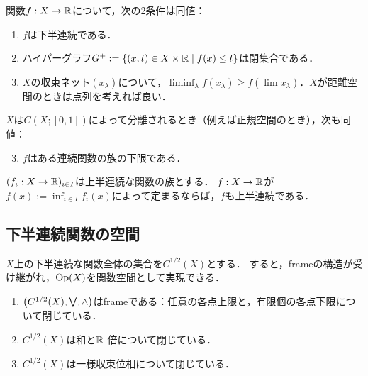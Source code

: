 \documentclass[uplatex,dvipdfmx]{jsreport}
\begin{document}
\begin{theorem}[下半連続性の特徴付け]
    関数$f:X\to\mathbb{R}$について，次の2条件は同値：
    \begin{enumerate}
        \item $f$は下半連続である．
        \item ハイパーグラフ$G^+:=\left\{(x,t)\in X\times\mathbb{R}\mid f(x)\le t\right\}$は閉集合である．
        \item $X$の収束ネット$(x_\lambda)$について，$\liminf_\lambda f(x_\lambda)\ge f(\lim x_\lambda)$．$X$が距離空間のときは点列を考えれば良い．
    \end{enumerate}
    $X$は$C(X;[0,1])$によって分離されるとき（例えば正規空間のとき），次も同値：
    \begin{enumerate}\setcounter{enumi}{2}
        \item $f$はある連続関数の族の下限である．
    \end{enumerate}
\end{theorem}

\begin{proposition}[上半連続性の保存]
    $(f_i:X\to\mathbb{R})_{i\in I}$は上半連続な関数の族とする．
    $f:X\to\mathbb{R}$が$f(x):=\inf_{i\in I}f_i(x)$によって定まるならば，$f$も上半連続である．
\end{proposition}

\subsection{下半連続関数の空間}

\begin{tcolorbox}[colframe=ForestGreen, colback=ForestGreen!10!white,breakable,colbacktitle=ForestGreen!40!white,coltitle=black,fonttitle=\bfseries\sffamily,
    title=]
    $X$上の下半連続な関数全体の集合を$C^{1/2}(X)$とする．
    すると，frameの構造が受け継がれ，$\mathrm{Op}(X)$を関数空間として実現できる．
\end{tcolorbox}

\begin{proposition}\mbox{}
    \begin{enumerate}
        \item $\left(C^{1/2}(X),\bigvee,\land\right)$はframeである：任意の各点上限と，有限個の各点下限について閉じている．
        \item $C^{1/2}(X)$は和と$\mathbb{R}$-倍について閉じている．
        \item $C^{1/2}(X)$は一様収束位相について閉じている．
    \end{enumerate}
\end{proposition}
\end{document}
